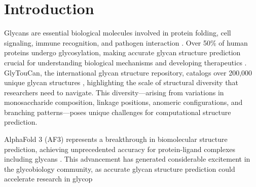 \documentclass[11pt,a4paper]{article}
\begin{document}
\section{Introduction}

Glycans are essential biological molecules involved in protein folding, cell signaling, immune recognition, and pathogen interaction \citep{varki2017}. Over 50\% of human proteins undergo glycosylation, making accurate glycan structure prediction crucial for understanding biological mechanisms and developing therapeutics \citep{helenius2004}. GlyTouCan, the international glycan structure repository, catalogs over 200,000 unique glycan structures \citep{tiemeyer2016}, highlighting the scale of structural diversity that researchers need to navigate. This diversity---arising from variations in monosaccharide composition, linkage positions, anomeric configurations, and branching patterns---poses unique challenges for computational structure prediction.

AlphaFold 3 (AF3) represents a breakthrough in biomolecular structure prediction, achieving unprecedented accuracy for protein-ligand complexes including glycans \citep{abramson2024}. This advancement has generated considerable excitement in the glycobiology community, as accurate glycan structure prediction could accelerate research in glycop
\end{document}
